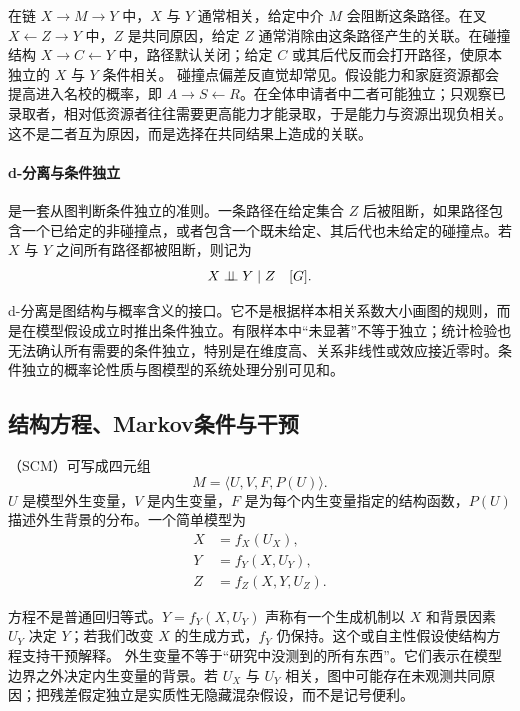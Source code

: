 在链 $X\rightarrow M\rightarrow Y$ 中，$X$ 与 $Y$ 通常相关，给定中介 $M$ 会阻断这条路径。在叉 $X\leftarrow Z\rightarrow Y$ 中，$Z$ 是共同原因，给定 $Z$ 通常消除由这条路径产生的关联。在碰撞结构 $X\rightarrow C\leftarrow Y$ 中，路径默认关闭；给定 $C$ 或其后代反而会打开路径，使原本独立的 $X$ 与 $Y$ 条件相关。
碰撞点偏差反直觉却常见。假设能力和家庭资源都会提高进入名校的概率，即 $A\rightarrow S\leftarrow R$。在全体申请者中二者可能独立；只观察已录取者，相对低资源者往往需要更高能力才能录取，于是能力与资源出现负相关。这不是二者互为原因，而是选择在共同结果上造成的关联。

\paragraph{d-分离与条件独立}

是一套从图判断条件独立的准则。一条路径在给定集合 $Z$ 后被阻断，如果路径包含一个已给定的非碰撞点，或者包含一个既未给定、其后代也未给定的碰撞点。若 $X$ 与 $Y$ 之间所有路径都被阻断，则记为
\[
X\mathrel{\perp\!\!\!\perp} Y\mid Z\quad [G].
\]

d-分离是图结构与概率含义的接口。它不是根据样本相关系数大小画图的规则，而是在模型假设成立时推出条件独立。有限样本中“未显著”不等于独立；统计检验也无法确认所有需要的条件独立，特别是在维度高、关系非线性或效应接近零时。条件独立的概率论性质与图模型的系统处理分别可见\textcite{dawid1979}和\textcite{lauritzen1996}。

\subsection{结构方程、Markov条件与干预}

（SCM）可写成四元组\parencite{pearl2009}
\[
M=\langle U,V,F,P(U)\rangle.
\]
$U$ 是模型外生变量，$V$ 是内生变量，$F$ 是为每个内生变量指定的结构函数，$P(U)$ 描述外生背景的分布。一个简单模型为
\begin{align*}
X&=f_X(U_X),\\
Y&=f_Y(X,U_Y),\\
Z&=f_Z(X,Y,U_Z).
\end{align*}

方程不是普通回归等式。$Y=f_Y(X,U_Y)$ 声称有一个生成机制以 $X$ 和背景因素 $U_Y$ 决定 $Y$；若我们改变 $X$ 的生成方式，$f_Y$ 仍保持。这个或自主性假设使结构方程支持干预解释。
外生变量不等于“研究中没测到的所有东西”。它们表示在模型边界之外决定内生变量的背景。若 $U_X$ 与 $U_Y$ 相关，图中可能存在未观测共同原因；把残差假定独立是实质性无隐藏混杂假设，而不是记号便利。

